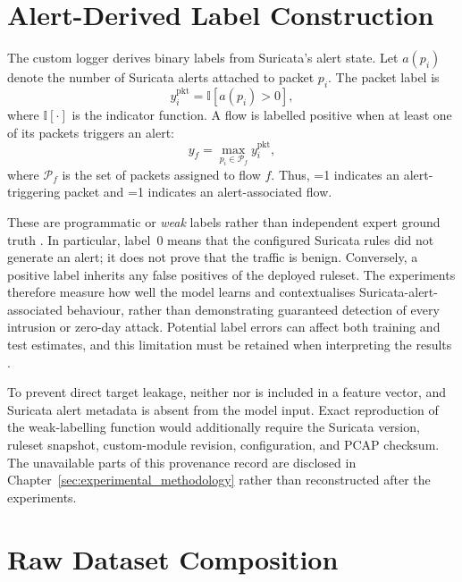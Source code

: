 \documentclass[11pt,fleqn]{report}
\begin{document}
\section{Alert-Derived Label Construction}
\label{subsec:label_construction}

The custom logger derives binary labels from Suricata's alert state. Let $a(p_i)$ denote the number of Suricata alerts attached to packet $p_i$. The packet label is
\begin{equation}
    y_i^{\mathrm{pkt}}
    = \mathbb{I}\!\left[a(p_i)>0\right],
    \label{eq:packet_alert_label}
\end{equation}
where $\mathbb{I}[\cdot]$ is the indicator function. A flow is labelled positive when at least one of its packets triggers an alert:
\begin{equation}
    y_f
    = \max_{p_i\in\mathcal{P}_f} y_i^{\mathrm{pkt}},
    \label{eq:flow_alert_label}
\end{equation}
where $\mathcal{P}_f$ is the set of packets assigned to flow $f$. Thus, =1 indicates an alert-triggering packet and =1 indicates an alert-associated flow.

These are programmatic or \emph{weak} labels rather than independent expert ground truth \cite{Ratner2017Snorkel}. In particular, label~0 means that the configured Suricata rules did not generate an alert; it does not prove that the traffic is benign. Conversely, a positive label inherits any false positives of the deployed ruleset. The experiments therefore measure how well the model learns and contextualises Suricata-alert-associated behaviour, rather than demonstrating guaranteed detection of every intrusion or zero-day attack. Potential label errors can affect both training and test estimates, and this limitation must be retained when interpreting the results \cite{Northcutt2021ConfidentLearning}.

To prevent direct target leakage, neither  nor  is included in a feature vector, and Suricata alert metadata is absent from the model input. Exact reproduction of the weak-labelling function would additionally require the Suricata version, ruleset snapshot, custom-module revision, configuration, and PCAP checksum. The unavailable parts of this provenance record are disclosed in Chapter~\ref{sec:experimental_methodology} rather than reconstructed after the experiments.

\section{Raw Dataset Composition}
\label{subsec:raw_composition}
\end{document}
